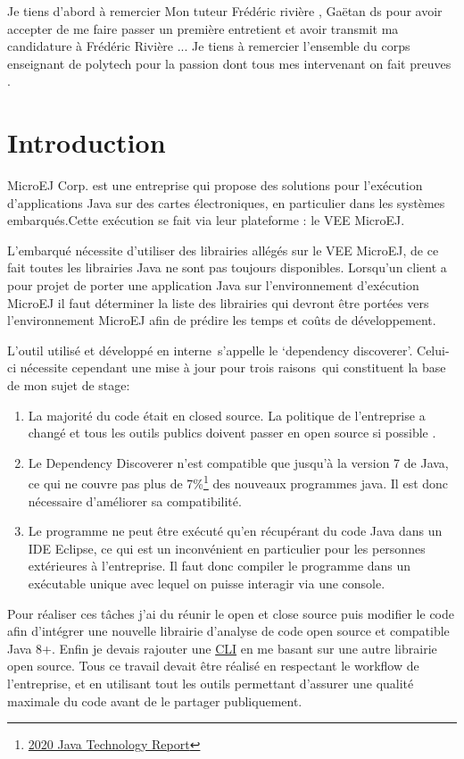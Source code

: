\documentclass[french,a4paper,12pt]{report}
\begin{document}
Je tiens d’abord à remercier Mon tuteur Frédéric rivière , Gaëtan ds pour avoir accepter de me faire passer un première entretient et avoir transmit ma candidature à Frédéric Rivière ...
Je tiens à remercier l’ensemble du corps enseignant de polytech pour la passion dont tous mes intervenant on fait preuves .

\chapter{Introduction}

MicroEJ Corp. est une entreprise qui propose des solutions pour  l’exécution d’applications Java sur des cartes électroniques, en particulier dans les systèmes embarqués.Cette exécution se fait via leur plateforme : le VEE MicroEJ.

L'embarqué nécessite d’utiliser des librairies allégés sur le VEE MicroEJ, de ce fait toutes les librairies Java ne sont pas toujours disponibles. Lorsqu’un client a pour projet de porter une application Java sur l’environnement d’exécution MicroEJ il faut déterminer la liste des librairies qui devront être portées vers l’environnement MicroEJ afin de prédire les temps et coûts de développement.

L’outil utilisé et développé en interne s’appelle le ‘dependency discoverer’. Celui-ci nécessite cependant une mise à jour pour trois raisons qui constituent la base de mon sujet de stage:

\begin{enumerate}
\item  La majorité du code était en closed source. La politique de l’entreprise a changé et tous les outils publics doivent passer en open source si possible .
\item Le Dependency Discoverer n’est compatible que jusqu’à la version 7 de Java, ce qui ne couvre pas plus de 7\%\footnote{\href{https://www.jrebel.com/blog/2020-java-technology-report}{2020 Java Technology Report}} des nouveaux programmes java. Il est donc nécessaire d’améliorer sa compatibilité. 
\item  Le programme ne peut être exécuté qu’en récupérant du code Java dans un IDE Eclipse, ce qui est un inconvénient en particulier pour les personnes extérieures à l’entreprise. Il faut donc compiler le programme dans un exécutable unique avec lequel on puisse interagir via une console.
\end{enumerate}

Pour réaliser ces tâches j’ai du réunir le open et close source puis modifier le code afin d’intégrer une nouvelle librairie d’analyse de code open source et compatible Java 8+. Enfin je devais rajouter une \hyperlink{CLI}{CLI} en me basant sur une autre librairie open source.
Tous ce travail devait être réalisé en respectant le workflow de l’entreprise, et en utilisant tout les outils permettant d’assurer une qualité maximale du code avant de le partager publiquement.
\end{document}
